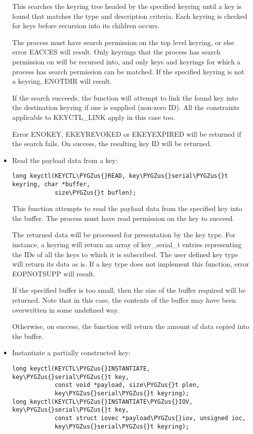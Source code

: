 \documentclass[a4paper,8pt,english]{sphinxmanual}
\def\PYGZus{\char`\_}
\begin{document}
\begin{itemize}
This searches the keyring tree headed by the specified keyring until a key
is found that matches the type and description criteria. Each keyring is
checked for keys before recursion into its children occurs.

The process must have search permission on the top level keyring, or else
error EACCES will result. Only keyrings that the process has search
permission on will be recursed into, and only keys and keyrings for which
a process has search permission can be matched. If the specified keyring
is not a keyring, ENOTDIR will result.

If the search succeeds, the function will attempt to link the found key
into the destination keyring if one is supplied (non-zero ID). All the
constraints applicable to KEYCTL\_LINK apply in this case too.

Error ENOKEY, EKEYREVOKED or EKEYEXPIRED will be returned if the search
fails. On success, the resulting key ID will be returned.

\item {} 
Read the payload data from a key:

\begin{Verbatim}[commandchars=\\\{\}]
long keyctl(KEYCTL\PYGZus{}READ, key\PYGZus{}serial\PYGZus{}t keyring, char *buffer,
            size\PYGZus{}t buflen);
\end{Verbatim}

This function attempts to read the payload data from the specified key
into the buffer. The process must have read permission on the key to
succeed.

The returned data will be processed for presentation by the key type. For
instance, a keyring will return an array of key\_serial\_t entries
representing the IDs of all the keys to which it is subscribed. The user
defined key type will return its data as is. If a key type does not
implement this function, error EOPNOTSUPP will result.

If the specified buffer is too small, then the size of the buffer required
will be returned.  Note that in this case, the contents of the buffer may
have been overwritten in some undefined way.

Otherwise, on success, the function will return the amount of data copied
into the buffer.

\item {} 
Instantiate a partially constructed key:

\begin{Verbatim}[commandchars=\\\{\}]
long keyctl(KEYCTL\PYGZus{}INSTANTIATE, key\PYGZus{}serial\PYGZus{}t key,
            const void *payload, size\PYGZus{}t plen,
            key\PYGZus{}serial\PYGZus{}t keyring);
long keyctl(KEYCTL\PYGZus{}INSTANTIATE\PYGZus{}IOV, key\PYGZus{}serial\PYGZus{}t key,
            const struct iovec *payload\PYGZus{}iov, unsigned ioc,
            key\PYGZus{}serial\PYGZus{}t keyring);
\end{Verbatim}


\end{itemize}
\end{document}
